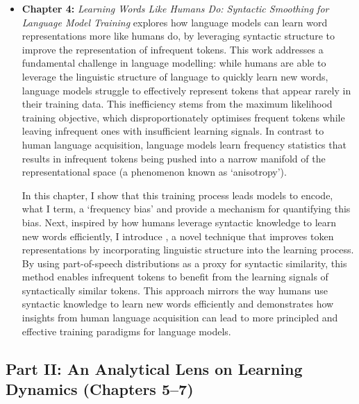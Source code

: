 \begin{itemize}
    \item \textbf{Chapter 4:} \emph{Learning Words Like Humans Do: Syntactic Smoothing for Language Model Training}  
    explores how language models can learn word representations more like humans do, by leveraging syntactic structure to improve the representation of infrequent tokens. This work addresses a fundamental challenge in language modelling: while humans are able to leverage the linguistic structure of language to quickly learn new words, language models struggle to effectively represent tokens that appear rarely in their training data. This inefficiency stems from the maximum likelihood training objective, which disproportionately optimises frequent tokens while leaving infrequent ones with insufficient learning signals. In contrast to human language acquisition, language models learn frequency statistics that results in infrequent tokens being pushed into a narrow manifold of the representational space (a phenomenon known as `anisotropy'). 

    In this chapter, I show that this training process leads models to encode, what I term, a `frequency bias' and provide a mechanism for quantifying this bias. Next, inspired by how humans leverage syntactic knowledge to learn new words efficiently, I introduce \smoothing, a novel technique that improves token representations by incorporating linguistic structure into the learning process. By using part-of-speech distributions as a proxy for syntactic similarity, this method enables infrequent tokens to benefit from the learning signals of syntactically similar tokens. This approach mirrors the way humans use syntactic knowledge to learn new words efficiently and demonstrates how insights from human language acquisition can lead to more principled and effective training paradigms for language models.

\end{itemize}

\subsection*{Part II: An Analytical Lens on Learning Dynamics (Chapters 5--7)}

